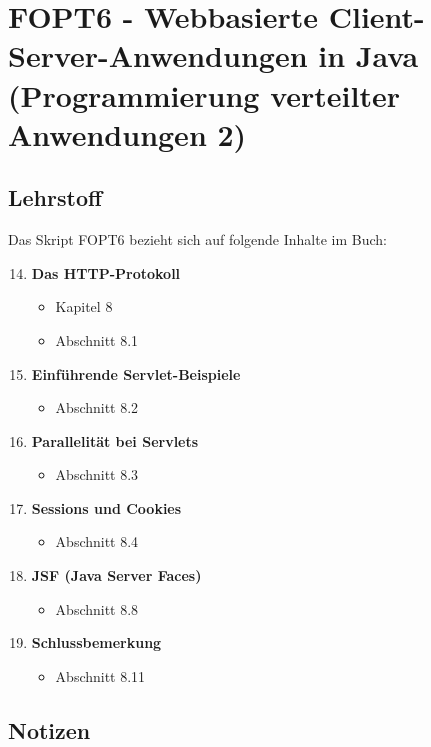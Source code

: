 \chapter{FOPT6 - Webbasierte Client-Server-Anwendungen in Java (Programmierung verteilter Anwendungen 2)}

\section{Lehrstoff}
Das Skript FOPT6 bezieht sich auf folgende Inhalte im Buch:

\begin{tcolorbox}[colback=white!20,color=white]
    \begin{enumerate}
        \setcounter{enumi}{13}
        \item \textbf{Das HTTP-Protokoll}
        \begin{itemize}
            \item[] Kapitel 8
            \item[] Abschnitt 8.1
        \end{itemize}

        \item \textbf{Einführende Servlet-Beispiele}
        \begin{itemize}
            \item[] Abschnitt 8.2
        \end{itemize}

        \item \textbf{Parallelität bei Servlets}
        \begin{itemize}
            \item[] Abschnitt 8.3
        \end{itemize}

        \item \textbf{Sessions und Cookies}
        \begin{itemize}
            \item[] Abschnitt 8.4
        \end{itemize}

        \item \textbf{JSF (Java Server Faces)}
        \begin{itemize}
            \item[] Abschnitt 8.8
        \end{itemize}

        \item \textbf{Schlussbemerkung}
        \begin{itemize}
            \item[] Abschnitt 8.11
        \end{itemize}

    \end{enumerate}
\end{tcolorbox}

\newpage






\newpage
\section*{Notizen}

\newpage
